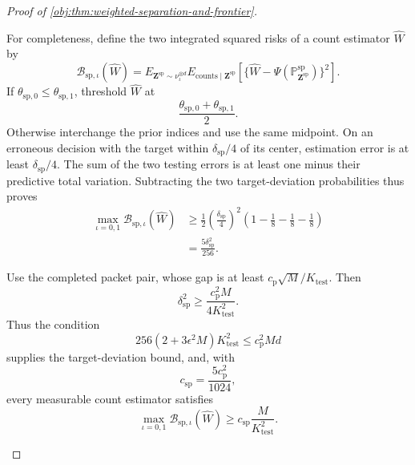 \documentclass[11pt]{article}
\begin{document}
\begin{proof}[Proof of \cref{obj:thm:weighted-separation-and-frontier}]
\begin{enumerate}
For completeness, define the two integrated squared risks of a count estimator \(\widehat W\) by
\[
\mathcal B_{\mathrm{sp},\iota}(\widehat W)
=
E_{\mathbf Z^{\mathrm{sp}}\sim\nu_\iota^{\otimes d}}
E_{\mathrm{counts}\mid\mathbf Z^{\mathrm{sp}}}
\left[
\{\widehat W-\Psi(\mathbb P_{\mathbf Z^{\mathrm{sp}}}^{\mathrm{sp}})\}^2
\right].
\]
If \(\theta_{\mathrm{sp},0}\le\theta_{\mathrm{sp},1}\), threshold
\(\widehat W\) at
\[
\frac{\theta_{\mathrm{sp},0}+\theta_{\mathrm{sp},1}}2.
\]
Otherwise interchange the prior indices and use the same midpoint. On an erroneous decision with the target within
\(\delta_{\mathrm{sp}}/4\) of its center, estimation error is at least
\(\delta_{\mathrm{sp}}/4\). The sum of the two testing errors is at least one minus their predictive total variation. Subtracting the two target-deviation probabilities thus proves
\[
\begin{aligned}
\max_{\iota=0,1}\mathcal B_{\mathrm{sp},\iota}(\widehat W)
&\ge
\frac12\left(\frac{\delta_{\mathrm{sp}}}{4}\right)^2
\left(1-\frac18-\frac18-\frac18\right)\\
&=\frac{5\delta_{\mathrm{sp}}^2}{256}.
\end{aligned}
\]

Use the completed packet pair, whose gap is at least
\(c_{\mathrm p}\sqrt M/K_{\mathrm{test}}\). Then
\[
\delta_{\mathrm{sp}}^2
\ge\frac{c_{\mathrm p}^2M}{4K_{\mathrm{test}}^2}.
\]
Thus the condition
\[
256(2+3\epsilon^2M)K_{\mathrm{test}}^2
\le c_{\mathrm p}^2Md
\]
supplies the target-deviation bound, and, with
\[
c_{\mathrm{sp}}=\frac{5c_{\mathrm p}^2}{1024},
\]
every measurable count estimator satisfies
\[
\max_{\iota=0,1}\mathcal B_{\mathrm{sp},\iota}(\widehat W)
\ge c_{\mathrm{sp}}\frac{M}{K_{\mathrm{test}}^2}.
\]


\end{enumerate}
\end{proof}
\end{document}
